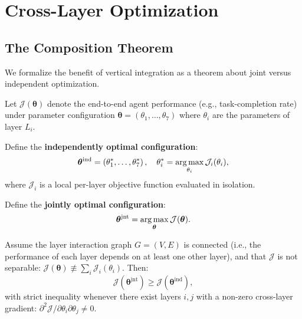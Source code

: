 \section{Cross-Layer Optimization}

\label{sec:optimization}

\subsection{The Composition Theorem}

We formalize the benefit of vertical integration as a theorem about joint
versus independent optimization.

Let $\mathcal{J}(\bm{\theta})$ denote the end-to-end agent performance (e.g.,
task-completion rate) under parameter configuration $\bm{\theta} =
(\theta_1, \ldots, \theta_7)$ where $\theta_i$ are the parameters of layer
$L_i$.

Define the \textbf{independently optimal configuration}:
\begin{equation}
    \bm{\theta}^{\text{ind}} = \left(\theta_1^*, \ldots, \theta_7^*\right),
    \quad \theta_i^* = \operatorname*{arg\,max}_{\theta_i} \mathcal{J}_i(\theta_i),
\end{equation}
where $\mathcal{J}_i$ is a local per-layer objective function evaluated in
isolation.

Define the \textbf{jointly optimal configuration}:
\begin{equation}
    \bm{\theta}^{\text{jnt}} = \operatorname*{arg\,max}_{\bm{\theta}} \mathcal{J}(\bm{\theta}).
\end{equation}

\begin{theorem}
\label{thm:dominance}
Assume the layer interaction graph $G = (V, E)$ is connected (i.e., the
performance of each layer depends on at least one other layer), and that
$\mathcal{J}$ is not separable: $\mathcal{J}(\bm{\theta}) \not\equiv
\sum_i \mathcal{J}_i(\theta_i)$. Then:
\begin{equation}
    \mathcal{J}(\bm{\theta}^{\text{jnt}}) \geq \mathcal{J}(\bm{\theta}^{\text{ind}}),
\end{equation}
with strict inequality whenever there exist layers $i, j$ with a non-zero
cross-layer gradient: $\partial^2 \mathcal{J} / \partial\theta_i \partial\theta_j \neq 0$.
\end{theorem}

